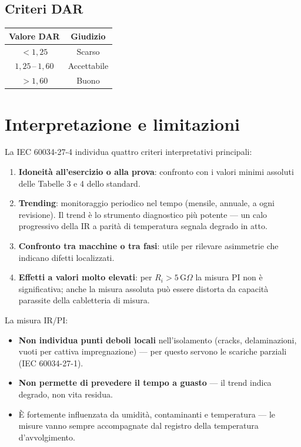 \documentclass[a4paper,11pt]{article}
\begin{document}
\subsection{Criteri DAR}

\begin{center}
\begin{tabular}{cc}
\toprule
\textbf{Valore DAR} & \textbf{Giudizio} \\
\midrule
$< 1{,}25$ & Scarso \\
$1{,}25\,\text{--}\,1{,}60$ & Accettabile \\
$> 1{,}60$ & Buono \\
\bottomrule
\end{tabular}
\end{center}

\section{Interpretazione e limitazioni}

La IEC 60034-27-4 individua quattro criteri interpretativi principali:

\begin{enumerate}
  \item \textbf{Idoneità all'esercizio o alla prova}: confronto con i valori minimi assoluti delle Tabelle 3 e 4 dello standard.
  \item \textbf{Trending}: monitoraggio periodico nel tempo (mensile, annuale, a ogni revisione). Il trend è lo strumento diagnostico più potente — un calo progressivo della IR a parità di temperatura segnala degrado in atto.
  \item \textbf{Confronto tra macchine o tra fasi}: utile per rilevare asimmetrie che indicano difetti localizzati.
  \item \textbf{Effetti a valori molto elevati}: per $R_i > 5\,\text{G}\Omega$ la misura PI non è significativa; anche la misura assoluta può essere distorta da capacità parassite della cabletteria di misura.
\end{enumerate}

\begin{notabox}[title=Limitazioni fondamentali]
La misura IR/PI:
\begin{itemize}
  \item \textbf{Non individua punti deboli locali} nell'isolamento (cracks, delaminazioni, vuoti per cattiva impregnazione) — per questo servono le scariche parziali (IEC 60034-27-1).
  \item \textbf{Non permette di prevedere il tempo a guasto} — il trend indica degrado, non vita residua.
  \item È fortemente influenzata da umidità, contaminanti e temperatura — le misure vanno sempre accompagnate dal registro della temperatura d'avvolgimento.
\end{itemize}
\end{notabox}
\end{document}
